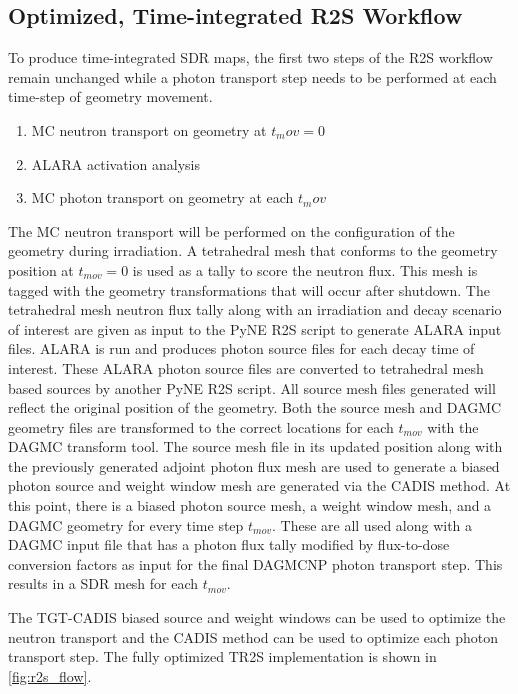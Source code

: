 \subsection{Optimized, Time-integrated R2S Workflow}
To produce time-integrated SDR maps, the
first two steps of the R2S workflow remain unchanged
while a photon transport step needs to be performed at each time-step of
geometry movement.
\begin{enumerate}
	\item{MC neutron transport on geometry at $t_mov=0$}
	\item{ALARA activation analysis} 
	\item{MC photon transport on geometry at each $t_mov$}
\end{enumerate}
The MC neutron transport will be performed on the configuration of the geometry 
during irradiation.
A tetrahedral mesh that conforms to
the geometry position at $t_{mov}=0$ is used as a tally to score the neutron flux.
This mesh is tagged with the geometry transformations that will occur after
shutdown.  The tetrahedral mesh neutron flux tally along with an irradiation and decay
scenario of interest are given as input to the PyNE R2S
script to generate ALARA input files.  ALARA is run and produces photon source
files for each decay time of interest.  These ALARA photon source files are
converted to tetrahedral mesh based sources by another PyNE R2S script.  All
source mesh files generated will reflect the original position of the geometry.
Both the source mesh and DAGMC geometry files are transformed to the 
correct locations for each $t_{mov}$ with the DAGMC transform tool.
The source mesh file in its updated position along with the previously
generated adjoint photon flux mesh are used to generate a biased photon source 
and weight window mesh are generated via the CADIS method.  At this point,
there is a biased photon source mesh, a weight window mesh, and a DAGMC
geometry for every time step $t_{mov}$.  These are all used along with a DAGMC
input file that has a photon flux tally modified by flux-to-dose conversion
factors as input for the final DAGMCNP photon transport step.  This results in
a SDR mesh for each $t_{mov}$.  

The TGT-CADIS biased source and weight windows can be used to optimize the 
neutron transport and the CADIS method can be used to optimize each photon
transport step.  The fully optimized TR2S implementation is shown in \ref{fig:r2s_flow}.

 


